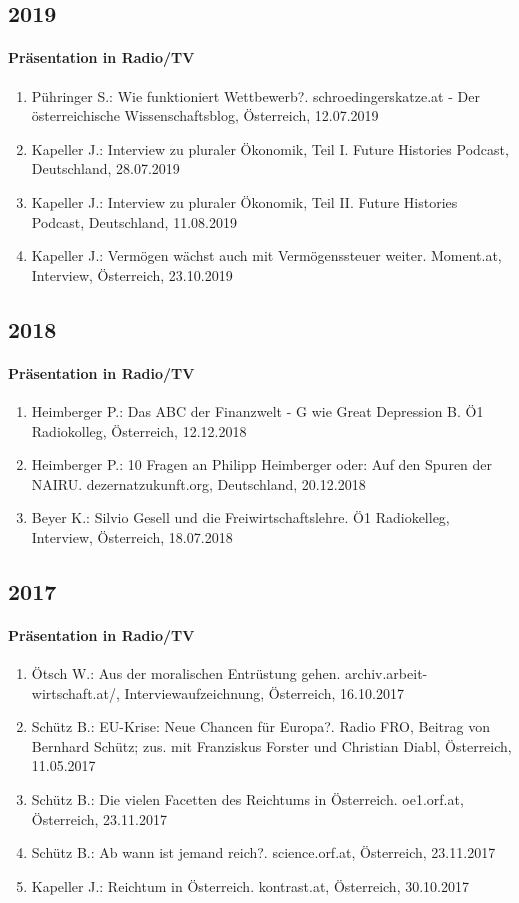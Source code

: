 \subsection*{2019}
\paragraph{Präsentation in Radio/TV}
\begin{enumerate}
	\item Pühringer S.: Wie funktioniert Wettbewerb?. schroedingerskatze.at - Der österreichische Wissenschaftsblog, Österreich, 12.07.2019
	\item Kapeller J.: Interview zu pluraler Ökonomik, Teil I. Future Histories Podcast, Deutschland, 28.07.2019
	\item Kapeller J.: Interview zu pluraler Ökonomik, Teil II. Future Histories Podcast, Deutschland, 11.08.2019
	\item Kapeller J.: Vermögen wächst auch mit Vermögenssteuer weiter. Moment.at, Interview, Österreich, 23.10.2019
\end{enumerate}
\subsection*{2018}
\paragraph{Präsentation in Radio/TV}
\begin{enumerate}
	\item Heimberger P.: Das ABC der Finanzwelt - G wie Great Depression B. Ö1 Radiokolleg, Österreich, 12.12.2018
	\item Heimberger P.: 10 Fragen an Philipp Heimberger oder: Auf den Spuren der NAIRU. dezernatzukunft.org, Deutschland, 20.12.2018
	\item Beyer K.: Silvio Gesell und die Freiwirtschaftslehre. Ö1 Radiokelleg, Interview, Österreich, 18.07.2018
\end{enumerate}
\subsection*{2017}
\paragraph{Präsentation in Radio/TV}
\begin{enumerate}
	\item Ötsch W.: Aus der moralischen Entrüstung gehen. archiv.arbeit-wirtschaft.at/, Interviewaufzeichnung, Österreich, 16.10.2017
	\item Schütz B.: EU-Krise: Neue Chancen für Europa?. Radio FRO, Beitrag von Bernhard Schütz; zus. mit Franziskus Forster und Christian Diabl, Österreich, 11.05.2017
	\item Schütz B.: Die vielen Facetten des Reichtums in Österreich. oe1.orf.at, Österreich, 23.11.2017
	\item Schütz B.: Ab wann ist jemand reich?. science.orf.at, Österreich, 23.11.2017
	\item Kapeller J.: Reichtum in Österreich. kontrast.at, Österreich, 30.10.2017
\end{enumerate}
